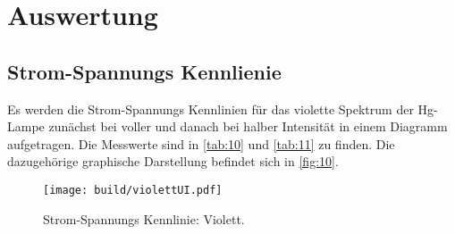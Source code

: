 \section{Auswertung}
\label{sec:Auswertung}

\subsection{Strom-Spannungs Kennlienie}
Es werden die Strom-Spannungs Kennlinien für das violette Spektrum der 
Hg-Lampe zunächst bei voller und danach bei halber Intensität in einem 
Diagramm aufgetragen. Die Messwerte sind in \autoref{tab:10} und \autoref{tab:11} 
zu finden. Die dazugehörige graphische Darstellung befindet sich in \autoref{fig:10}.

\begin{figure}[H]
    \centering
    \caption{Strom-Spannungs Kennlinie: Violett.}
    \label{fig:10}
    \texttt{[image: build/violettUI.pdf]}
\end{figure}    

